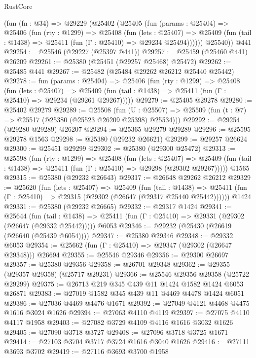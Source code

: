 \begin{lexlean}{RustCore}
\begin{coremodule}
    (fun (fn : @34) =>
    @29229
      (@25402
        (@25405
          (fun (params : @25404) =>
          @25406
            (fun (rty : @1299) =>
            @25408
              (fun (lets : @25407) =>
              @25409 (fun (tail : @1438) => @25411 (fun (Γ : @25410) => @29234 @25494))))))
        @25540))
    @441
@29254 := @25546 (@29227 (@25397 @441))
@29257 := @25459 (@25460 @441) @26209
@29261 := @25380 (@25451 (@29257 @25468) @25472)
@29262 := @25485 @441
@29267 := @25482 (@25484 @29262 @26212 @25440 @25442)
@29278 := fun (params : @25404) =>
  @25406
    (fun (rty : @1299) =>
    @25408
      (fun (lets : @25407) =>
      @25409 (fun (tail : @1438) => @25411 (fun (Γ : @25410) => @29234 (@29261 @29267)))))
@29279 := @25405 @29278
@29280 := @25402 @29279
@29289 := @25508
    (fun (U : @25507) => @25509 (fun (t : @7) => @25517 (@25380 (@25523 @26209 @25398) @25534)))
@29292 := @29254 (@29280 @29289) @26207
@29294 := @25365 @29279 @29289
@29296 := @25595 @29278 @1563
@29298 := @25380 (@29232 @26621)
@29299 := @29257 @26624
@29300 := @25451 @29299
@29302 := @25380 (@29300 @25472)
@29313 := @25598
    (fun (rty : @1299) =>
    @25408
      (fun (lets : @25407) =>
      @25409 (fun (tail : @1438) => @25411 (fun (Γ : @25410) => @29298 (@29302 @29267)))))
    @1565
@29315 := @25380 (@29232 @26643)
@29317 := @26648 @29262 @26212
@29329 := @25620
    (fun (lets : @25407) =>
    @25409
      (fun (tail : @1438) =>
      @25411 (fun (Γ : @25410) => @29315 (@29302 (@26647 (@29317 @25440 @25442))))))
    @1424
@29331 := @25380 (@29232 @26665)
@29332 := @29317 @1424
@29341 := @25644
    (fun (tail : @1438) => @25411 (fun (Γ : @25410) => @29331 (@29302 (@26647 (@29332 @25442)))))
    @6053
@29346 := @29232 (@25430 (@26619 (@26640 (@25439 @6054))))
@29347 := @25380 @29346
@29348 := @29332 @6053
@29354 := @25662 (fun (Γ : @25410) => @29347 (@29302 (@26647 @29348))) @26694
@29355 := @25546 @29346
@29356 := @29300 @26697
@29357 := @25380 @29356
@29358 := @26701 @29348
@29362 := @29355 (@29357 @29358) (@25717 @29231)
@29366 := @25546 @29356 @29358 (@25722 @29299)
@29375 := @26713 @219 @345 @439 @11 @1424 @1582 @1424 @6053 @26871
@29383 := @27019 @1582 @345 @439 @11 @4469 @4478 @1424 @6051
@29386 := @27036 @4469 @4476 @1671
@29392 := @27049 @4121 @4468 @4475 @1616 @3024 @1626
@29394 := @27063 @4110 @4119
@29397 := @27075 @4110 @4117 @1958
@29403 := @27082 @3729 @4109 @4116 @1616 @3032 @1626
@29405 := @27090 @3718 @3727
@29408 := @27096 @3718 @3725 @1671
@29414 := @27103 @3704 @3717 @3724 @1616 @3040 @1626
@29416 := @27111 @3693 @3702
@29419 := @27116 @3693 @3700 @1958

\end{coremodule}
\end{lexlean}
